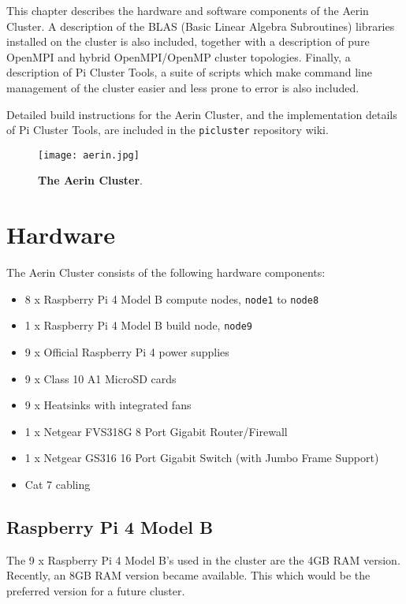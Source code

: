 This chapter describes the hardware and software components of the Aerin Cluster. A description of the BLAS (Basic Linear Algebra Subroutines) libraries installed on the cluster is also included, together with a description of pure OpenMPI and hybrid OpenMPI/OpenMP cluster topologies. Finally, a description of Pi Cluster Tools, a suite of scripts which make command line management of the cluster easier and less prone to error is also included. 

Detailed build instructions for the Aerin Cluster, and the implementation details of Pi Cluster Tools, are included in the \verb|picluster| repository wiki. 

\begin{figure}[h]
	\centering	
	\texttt{[image: aerin.jpg]}
	\caption{\textbf{The Aerin Cluster}.}
\end{figure}



%
%
\section{Hardware}

The Aerin Cluster consists of the following hardware components:

\begin{itemize}
  \item 8 x Raspberry Pi 4 Model B compute nodes, \verb|node1| to \verb|node8|
  \item 1 x Raspberry Pi 4 Model B build node, \verb|node9|
  \item 9 x Official Raspberry Pi 4 power supplies
  \item 9 x Class 10 A1 MicroSD cards
  \item 9 x Heatsinks with integrated fans
  \item 1 x Netgear FVS318G 8 Port Gigabit Router/Firewall
  \item 1 x Netgear GS316 16 Port Gigabit Switch (with Jumbo Frame Support)
  \item Cat 7 cabling
\end{itemize}


%
%
\subsection{Raspberry Pi 4 Model B}
The 9 x Raspberry Pi 4 Model B's used in the cluster are the 4GB RAM version. Recently, an 8GB RAM version became available. This which would be the preferred version for a future cluster.

